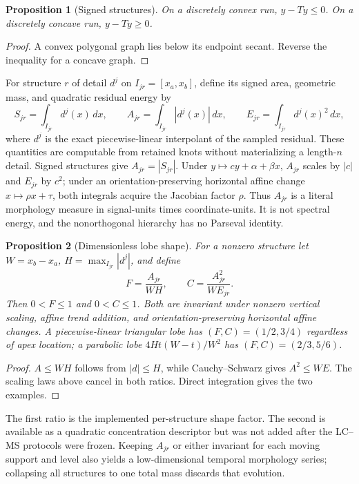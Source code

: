 \documentclass[review,onefignum,onetabnum]{siamonline250211}
\newtheorem{proposition}{Proposition}
\begin{document}
\begin{proposition}[Signed structures]
On a discretely convex run, $y-Ty\le0$.  On a discretely concave run,
$y-Ty\ge0$.
\end{proposition}
\begin{proof}
A convex polygonal graph lies below its endpoint secant.  Reverse the inequality
for a concave graph.
\end{proof}

For structure $r$ of detail $d^j$ on $I_{jr}=[x_a,x_b]$, define its signed
area, geometric mass, and quadratic residual energy by
\begin{equation}
S_{jr}=\int_{I_{jr}}d^j(x)\,dx,\qquad
A_{jr}=\int_{I_{jr}}|d^j(x)|\,dx,\qquad
E_{jr}=\int_{I_{jr}}d^j(x)^2\,dx,
\label{eq:geometric-mass}
\end{equation}
where $d^j$ is the exact piecewise-linear interpolant of the sampled residual.
These quantities are computable from retained knots without materializing a
length-$n$ detail.  Signed structures give $A_{jr}=|S_{jr}|$.  Under
$y\mapsto cy+\alpha+\beta x$, $A_{jr}$ scales by $|c|$ and $E_{jr}$ by $c^2$;
under an orientation-preserving horizontal affine change
$x\mapsto\rho x+\tau$, both integrals acquire the Jacobian factor $\rho$.
Thus $A_{jr}$ is a literal morphology measure in signal-units times
coordinate-units.  It is not spectral energy, and the nonorthogonal hierarchy
has no Parseval identity.

\begin{proposition}[Dimensionless lobe shape]
For a nonzero structure let $W=x_b-x_a$, $H=\max_{I_{jr}}|d^j|$, and define
\begin{equation}
 F=\frac{A_{jr}}{WH},\qquad
 C=\frac{A_{jr}^2}{W E_{jr}}.
\end{equation}
Then $0<F\le1$ and $0<C\le1$.  Both are invariant under nonzero vertical
scaling, affine trend addition, and orientation-preserving horizontal affine
changes.  A piecewise-linear triangular lobe has $(F,C)=(1/2,3/4)$ regardless
of apex location; a parabolic lobe $4Ht(W-t)/W^2$ has
$(F,C)=(2/3,5/6)$.
\end{proposition}
\begin{proof}
$A\le WH$ follows from $|d|\le H$, while Cauchy--Schwarz gives
$A^2\le WE$.  The scaling laws above cancel in both ratios.  Direct integration
gives the two examples.
\end{proof}

The first ratio is the implemented per-structure shape factor.  The second is
available as a quadratic concentration descriptor but was not added after the
LC--MS protocols were frozen.  Keeping $A_{jr}$ or either invariant for each
moving support and level also yields a low-dimensional temporal morphology
series; collapsing all structures to one total mass discards that evolution.
\end{document}
